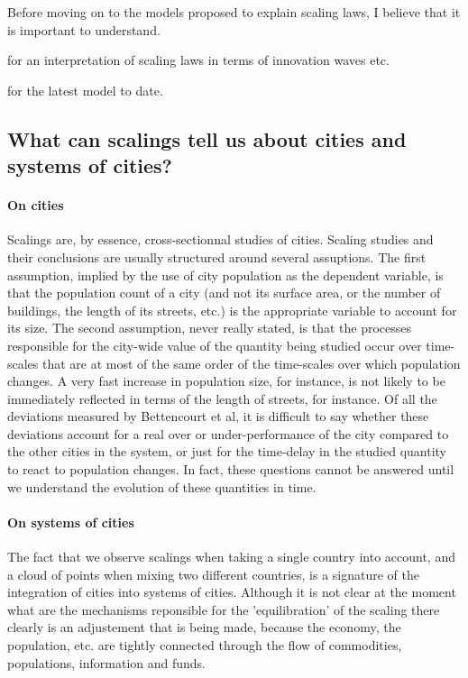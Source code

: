 Before moving on to the models proposed to explain scaling laws, I believe that
it is important to understand. 
    
\cite{Pumain:2006} for an interpretation of scaling laws in terms of
innovation waves etc.

\cite{Bettencourt:2013} for the latest model to date.


\subsection{What can scalings tell us about cities and systems of
cities?}
\label{sub:what_can_scalings_tell_us_about_cities_and_systems_of_cities_}

\paragraph{On cities} Scalings are, by essence, cross-sectionnal studies of cities. Scaling studies
and their conclusions are usually structured around several assuptions. The
first assumption, implied by the use of city population as the dependent
variable, is that the population count of a city (and not its surface area, or the
number of buildings, the length of its streets, etc.) is the appropriate variable to
account for its size. The second assumption, never really stated, is that the
processes responsible for the city-wide value of the quantity being studied
occur over time-scales that are at most of the same order of the time-scales
over which population changes. A very fast increase in population size, for
instance, is not likely to be immediately reflected in terms of the length of
streets, for instance. Of all the deviations measured by Bettencourt et al, it
is difficult to say whether these deviations account for a real over or
under-performance of the city compared to the other cities in the system, or
just for the time-delay in the studied quantity to react to population
changes. In fact, these questions cannot be answered until we understand the
evolution of these quantities in time.

\paragraph{On systems of cities} The fact that we observe scalings when taking a
single country into account, and a cloud of points when mixing two different
countries, is a signature of the integration of cities into systems of
cities. Although it is not clear at the moment what are the mechanisms
reponsible for the 'equilibration' of the scaling there clearly is an
adjustement that is being made, because the economy, the population, etc. are
tightly connected through the flow of commodities, populations, information and
funds.

